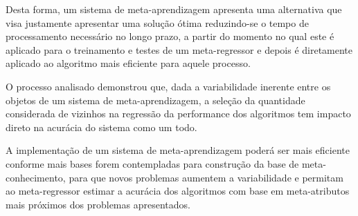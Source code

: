 \documentclass[runningheads]{llncs}
\begin{document}
Desta forma, um sistema de meta-aprendizagem apresenta uma alternativa que visa justamente apresentar uma solução ótima reduzindo-se o tempo de processamento necessário no longo prazo, a partir do momento no qual este é aplicado para o treinamento e testes de um meta-regressor e depois é diretamente aplicado ao algoritmo mais eficiente para aquele processo.

O processo analisado demonstrou que, dada a variabilidade inerente entre os objetos de um sistema de meta-aprendizagem, a seleção da quantidade considerada de vizinhos na regressão da performance dos algoritmos tem impacto direto na acurácia do sistema como um todo.

A implementação de um sistema de meta-aprendizagem poderá ser mais eficiente conforme mais bases forem contempladas para construção da base de meta-conhecimento, para que novos problemas aumentem a variabilidade e permitam ao meta-regressor estimar a acurácia dos algoritmos com base em meta-atributos mais próximos dos problemas apresentados.
\end{document}
